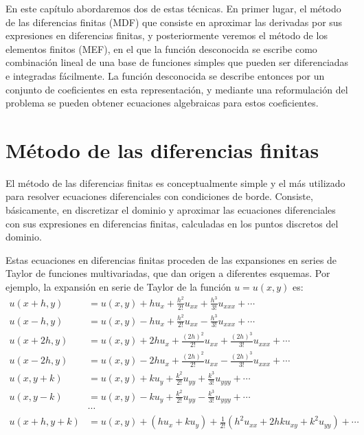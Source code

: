 En este capítulo abordaremos dos de estas técnicas. En primer lugar, el método de las diferencias finitas (MDF) que consiste en aproximar las derivadas por sus expresiones en diferencias finitas, y posteriormente veremos el método de los elementos finitos (MEF), en el que la función desconocida se escribe como combinación lineal de una base de funciones simples que pueden ser diferenciadas e integradas fácilmente. La función desconocida se describe entonces por un conjunto de coeficientes en esta representación, y mediante una reformulación
del problema se pueden obtener ecuaciones algebraicas para estos coeficientes.
 

\section{Método de las diferencias finitas}
El método de las diferencias finitas es conceptualmente simple y el más utilizado para resolver ecuaciones diferenciales con condiciones de borde. Consiste, básicamente, en discretizar el dominio y aproximar las ecuaciones diferenciales con sus expresiones en diferencias finitas, calculadas en los puntos discretos del dominio.

Estas ecuaciones en diferencias finitas proceden de las expansiones en series de Taylor de funciones multivariadas, que dan origen a diferentes esquemas. Por ejemplo, la expansión en serie de Taylor de la función $u = u(x,y)$ es:
\begin{align*}
 u(x + h, y) &= u(x,y) + h u_x + \frac{h^2}{2!} u_{xx} + \frac{h^3}{3!} u_{xxx} + \cdots \\
 u(x - h, y) &= u(x,y) - h u_x + \frac{h^2}{2!} u_{xx} - \frac{h^3}{3!} u_{xxx} + \cdots \\
 u(x + 2h, y) &= u(x,y) + 2h u_x + \frac{(2h)^2}{2!} u_{xx} + \frac{(2h)^3}{3!} u_{xxx} + \cdots \\
 u(x - 2h, y) &= u(x,y) - 2h u_x + \frac{(2h)^2}{2!} u_{xx} - \frac{(2h)^3}{3!} u_{xxx} + \cdots \\
 u(x, y + k) &= u(x,y) + k u_y + \frac{k^2}{2!} u_{yy} + \frac{k^3}{3!} u_{yyy} + \cdots \\
 u(x, y - k) &= u(x,y) - k u_y + \frac{k^2}{2!} u_{yy} - \frac{k^3}{3!} u_{yyy} + \cdots \\
            &\cdots \\
 u(x + h, y +k) &= u(x,y) + (h u_x + k u_y) + \frac{1}{2!} (h^2 u_{xx} + 2 h k u_{xy} + k^2 u_{yy}) + \cdots
 \end{align*}
 
